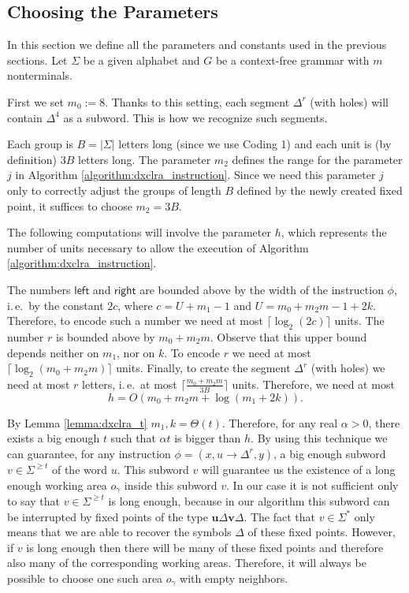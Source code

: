\subsection{Choosing the Parameters}\label{section:dxclra_parameters}

In this section we define all the parameters and constants used in the previous sections. Let $\Sigma$ be a given alphabet and $G$ be a context-free grammar with $m$ nonterminals.

First we set $m_0 := 8$. Thanks to this setting, each segment $\Delta^r$ (with holes) will contain $\Delta^4$ as a subword. This is how we recognize such segments.

Each group is $B = |\Sigma|$ letters long (since we use Coding 1) and each unit is (by definition) $3 B$ letters long. The parameter $m_2$ defines the range for the parameter $j$ in Algorithm \ref{algorithm:dxclra_instruction}. Since we need this parameter $j$ only to correctly adjust the groups of length $B$ defined by the newly created fixed point, it suffices to choose $m_2 = 3 B$.

The following computations will involve the parameter $h$, which represents the number of units necessary to allow the execution of Algorithm \ref{algorithm:dxclra_instruction}.

The numbers $\textsf{left}$ and $\textsf{right}$ are bounded above by the width of the instruction $\phi$, i.\,e.\ by the constant $2c$, where $c = U + m_1 - 1$ and $U = m_0 + m_2 m - 1 + 2k$. Therefore, to encode such a number we need at most $\lceil \log_2(2c) \rceil$ units. The number $r$ is bounded above by $m_0 + m_2 m$. Observe that this upper bound depends neither on $m_1$, nor on $k$. To encode $r$ we need at most $\lceil \log_2(m_0 + m_2 m) \rceil$ units. Finally, to create the segment $\Delta^r$ (with holes) we need at most $r$ letters, i.\,e.\ at most $\lceil \frac{m_0 + m_2 m}{3 B} \rceil$ units. Therefore, we need at most
$$h = O(m_0 + m_2 m + \log(m_1 + 2k)).$$

By Lemma \ref{lemma:dxclra_t} $m_1, k = \Theta(t)$. Therefore, for any real $\alpha > 0$, there exists a big enough $t$ such that $\alpha t$ is bigger than $h$. By using this technique we can guarantee, for any instruction $\phi = (x, u \to \Delta^r, y)$, a big enough subword $v \in \Sigma^{\ge t}$ of the word $u$. This subword $v$ will guarantee us the existence of a long enough working area $o_{\gamma}$ inside this subword $v$. In our case it is not sufficient only to say that $v \in \Sigma^{\ge t}$ is long enough, because in our algorithm this subword can be interrupted by fixed points of the type $\mathbf{u} \Delta \mathbf{v} \Delta$. The fact that $v \in \Sigma^*$ only means that we are able to recover the symbols $\Delta$ of these fixed points. However, if $v$ is long enough then there will be many of these fixed points and therefore also many of the corresponding working areas. Therefore, it will always be possible to choose one such area $o_{\gamma}$ with empty neighbors.

